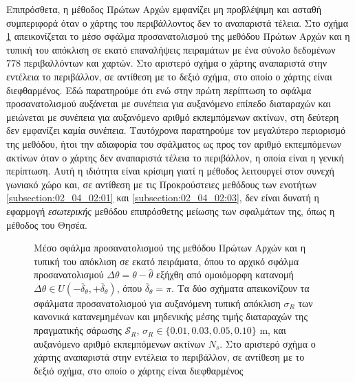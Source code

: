 Επιπρόσθετα, η μέθοδος Πρώτων Αρχών εμφανίζει μη προβλέψιμη και ασταθή
συμπεριφορά όταν ο χάρτης του περιβάλλοντος δεν το αναπαριστά τέλεια. Στο σχήμα
\ref{fig:02_04_02:errorbar_x1} απεικονίζεται το μέσο σφάλμα προσανατολισμού της
μεθόδου Πρώτων Αρχών και η τυπική του απόκλιση σε εκατό επαναλήψεις πειραμάτων
με ένα σύνολο δεδομένων $778$ περιβαλλόντων και χαρτών. Στο αριστερό σχήμα ο
χάρτης αναπαριστά στην εντέλεια το περιβάλλον, σε αντίθεση με το δεξιό σχήμα,
στο οποίο ο χάρτης είναι διεφθαρμένος.  Εδώ παρατηρούμε ότι ενώ στην πρώτη
περίπτωση το σφάλμα προσανατολισμού αυξάνεται με συνέπεια για αυξανόμενο
επίπεδο διαταραχών και μειώνεται με συνέπεια για αυξανόμενο αριθμό εκπεμπόμενων
ακτίνων, στη δεύτερη δεν εμφανίζει καμία συνέπεια. Ταυτόχρονα παρατηρούμε τον
μεγαλύτερο περιορισμό της μεθόδου, ήτοι την αδιαφορία του σφάλματος ως προς τον
αριθμό εκπεμπόμενων ακτίνων όταν ο χάρτης δεν αναπαριστά τέλεια το περιβάλλον,
η οποία είναι η γενική περίπτωση.  Αυτή η ιδιότητα είναι κρίσιμη γιατί η
μέθοδος λειτουργεί στον συνεχή γωνιακό χώρο και, σε αντίθεση με τις
Προκρούστειες μεθόδους των ενοτήτων \ref{subsection:02_04_02:01} και
\ref{subsection:02_04_02:03}, δεν είναι δυνατή η εφαρμογή \textit{εσωτερικής}
μεθόδου επιπρόσθετης μείωσης των σφαλμάτων της, όπως η μέθοδος του Θησέα.

\begin{figure}[!h]\centering
  \vspace{2cm}
  
  \vspace{1cm}
  \caption{\small Μέσο σφάλμα προσανατολισμού της μεθόδου Πρώτων Αρχών και η
           τυπική του απόκλιση σε εκατό πειράματα, όπου το αρχικό σφάλμα
           προσανατολισμού $\Delta \theta = \theta-\hat{\theta}$ εξήχθη από
           ομοιόμορφη κατανομή $\Delta \theta \in
           U(-\overline{\delta}_{\theta}, +\overline{\delta}_{\theta})$, όπου
           $\overline{\delta}_{\theta} = \pi$. Τα δύο σχήματα απεικονίζουν τα
           σφάλματα προσανατολισμού για αυξανόμενη τυπική απόκλιση $\sigma_R$
           των κανονικά κατανεμημένων και μηδενικής μέσης τιμής διαταραχών της
           πραγματικής σάρωσης
           $\mathcal{S}_R$, $\sigma_R \in \{0.01,0.03,0.05,0.10\}$ m, και
           αυξανόμενο αριθμό εκπεμπόμενων ακτίνων $N_s$. Στο αριστερό σχήμα ο
           χάρτης αναπαριστά στην εντέλεια το περιβάλλον, σε αντίθεση με το
           δεξιό σχήμα, στο οποίο ο χάρτης είναι διεφθαρμένος}
  \label{fig:02_04_02:errorbar_x1}
\end{figure}

